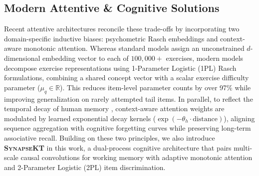 \documentclass[11pt]{article}
\begin{document}
\subsection{Modern Attentive \& Cognitive Solutions}
Recent attentive architectures reconcile these trade-offs by incorporating two domain-specific inductive biases: psychometric Rasch embeddings and context-aware monotonic attention. Whereas standard models assign an unconstrained $d$-dimensional embedding vector to each of $100,000+$ exercises, modern models \citep{ghosh2020context,liu2023simplekt} decompose exercise representations using 1-Parameter Logistic (1PL) Rasch formulations, combining a shared concept vector with a scalar exercise difficulty parameter ($\mu_q \in \mathbb{R}$). This reduces item-level parameter counts by over 97\% while improving generalization on rarely attempted tail items. In parallel, to reflect the temporal decay of human memory \citep{ghosh2020context}, context-aware attention weights are modulated by learned exponential decay kernels ($\exp(-\theta_h \cdot \text{distance})$), aligning sequence aggregation with cognitive forgetting curves while preserving long-term associative recall. Building on these two principles, we also introduce \textbf{\textsc{SynapseKT}} in this work, a dual-process cognitive architecture that pairs multi-scale causal convolutions for working memory with adaptive monotonic attention and 2-Parameter Logistic (2PL) item discrimination.
\end{document}
